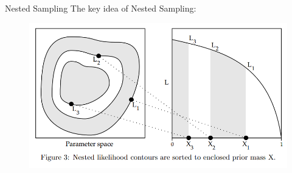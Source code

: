\begin{frame}[t]{Nested Sampling}
The key idea of Nested Sampling: 

\begin{figure}
\begin{center}
\includegraphics[scale=0.4]{ns.png}
\end{center}
\end{figure}


\end{frame}


